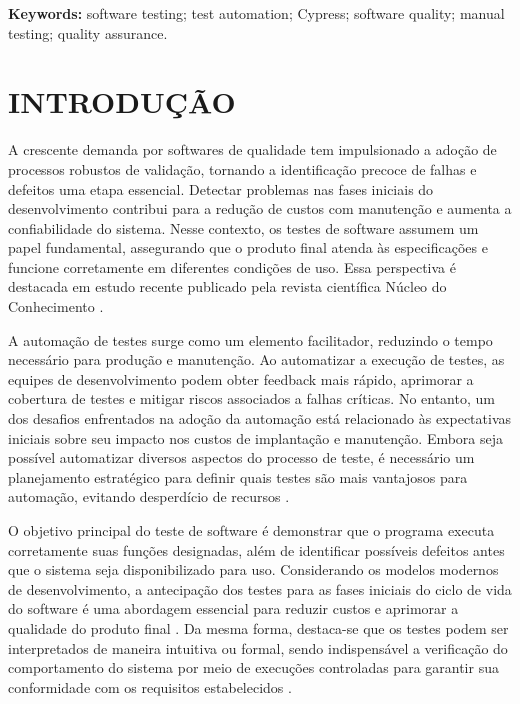 \documentclass{UNESC}
\begin{document}
\vspace{0.5em}
\noindent
\textbf{Keywords:} software testing; test automation; Cypress; software quality; manual testing; quality assurance.
\section{INTRODUÇÃO}
A crescente demanda por softwares de qualidade tem impulsionado a adoção de processos robustos de validação, tornando a identificação precoce de falhas e defeitos uma etapa essencial. Detectar problemas nas fases iniciais do desenvolvimento contribui para a redução de custos com manutenção e aumenta a confiabilidade do sistema. Nesse contexto, os testes de software assumem um papel fundamental, assegurando que o produto final atenda às especificações e funcione corretamente em diferentes condições de uso. Essa perspectiva é destacada em estudo recente publicado pela revista científica Núcleo do Conhecimento \cite{nucleodoconhecimento}.

A automação de testes surge como um elemento facilitador, reduzindo o tempo necessário para produção e manutenção. Ao automatizar a execução de testes, as equipes de desenvolvimento podem obter feedback mais rápido, aprimorar a cobertura de testes e mitigar riscos associados a falhas críticas. No entanto, um dos desafios enfrentados na adoção da automação está relacionado às expectativas iniciais sobre seu impacto nos custos de implantação e manutenção. Embora seja possível automatizar diversos aspectos do processo de teste, é necessário um planejamento estratégico para definir quais testes são mais vantajosos para automação, evitando desperdício de recursos \cite{nucleodoconhecimento}.

O objetivo principal do teste de software é demonstrar que o programa executa corretamente suas funções designadas, além de identificar possíveis defeitos antes que o sistema seja disponibilizado para uso. Considerando os modelos modernos de desenvolvimento, a antecipação dos testes para as fases iniciais do ciclo de vida do software é uma abordagem essencial para reduzir custos e aprimorar a qualidade do produto final \cite{SOMMERVILE}. Da mesma forma, destaca-se que os testes podem ser interpretados de maneira intuitiva ou formal, sendo indispensável a verificação do comportamento do sistema por meio de execuções controladas para garantir sua conformidade com os requisitos estabelecidos \cite{PRESSMAN}.
\end{document}
